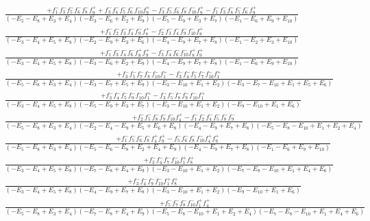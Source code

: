 \documentclass{article}
\begin{document}
\[\begin{array}{rcl}
\frac{+f_{1}^{-}f_{3}^{-}f_{5}^{-}f_{6}^{-}f_{8}^{-}f_{9}^{+}+f_{3}^{-}f_{4}^{-}f_{5}^{-}f_{6}^{-}f_{10}^{-}f_{9}^{+}-f_{3}^{-}f_{5}^{-}f_{6}^{-}f_{8}^{-}f_{10}^{-}f_{9}^{+}-f_{1}^{-}f_{3}^{-}f_{4}^{-}f_{5}^{-}f_{6}^{-}f_{9}^{+}}{(-E_{5}-E_{8}+E_{3}+E_{4})(-E_{3}-E_{6}+E_{2}+E_{9})(-E_{5}-E_{9}+E_{3}+E_{7})(-E_{1}-E_{6}+E_{9}+E_{10})}\\
\frac{+f_{1}^{-}f_{2}^{-}f_{3}^{-}f_{4}^{-}f_{9}^{-}f_{8}^{+}-f_{2}^{-}f_{3}^{-}f_{4}^{-}f_{9}^{-}f_{10}^{-}f_{8}^{+}}{(-E_{3}-E_{4}+E_{5}+E_{8})(-E_{2}-E_{9}+E_{3}+E_{6})(-E_{4}-E_{9}+E_{7}+E_{8})(-E_{1}-E_{2}+E_{3}+E_{10})}\\
\frac{+f_{1}^{-}f_{3}^{-}f_{4}^{-}f_{6}^{-}f_{8}^{+}f_{9}^{+}-f_{3}^{-}f_{4}^{-}f_{6}^{-}f_{10}^{-}f_{8}^{+}f_{9}^{+}}{(-E_{3}-E_{4}+E_{5}+E_{8})(-E_{3}-E_{6}+E_{2}+E_{9})(-E_{4}-E_{9}+E_{7}+E_{8})(-E_{1}-E_{6}+E_{9}+E_{10})}\\
\frac{+f_{3}^{-}f_{5}^{-}f_{7}^{-}f_{8}^{-}f_{10}^{-}f_{1}^{+}-f_{3}^{-}f_{4}^{-}f_{5}^{-}f_{7}^{-}f_{10}^{-}f_{1}^{+}}{(-E_{5}-E_{8}+E_{3}+E_{4})(-E_{3}-E_{7}+E_{5}+E_{9})(-E_{3}-E_{10}+E_{1}+E_{2})(-E_{3}-E_{7}-E_{10}+E_{1}+E_{5}+E_{6})}\\
\frac{+f_{3}^{-}f_{4}^{-}f_{5}^{-}f_{9}^{-}f_{10}^{-}f_{1}^{+}-f_{3}^{-}f_{5}^{-}f_{8}^{-}f_{9}^{-}f_{10}^{-}f_{1}^{+}}{(-E_{3}-E_{4}+E_{5}+E_{8})(-E_{5}-E_{9}+E_{3}+E_{7})(-E_{3}-E_{10}+E_{1}+E_{2})(-E_{9}-E_{10}+E_{1}+E_{6})}\\
\frac{+f_{2}^{-}f_{5}^{-}f_{8}^{-}f_{9}^{-}f_{10}^{-}f_{4}^{+}-f_{1}^{-}f_{2}^{-}f_{4}^{-}f_{5}^{-}f_{8}^{-}f_{9}^{-}}{(-E_{5}-E_{8}+E_{3}+E_{4})(-E_{2}-E_{4}-E_{9}+E_{5}+E_{6}+E_{8})(-E_{4}-E_{9}+E_{7}+E_{8})(-E_{5}-E_{8}-E_{10}+E_{1}+E_{2}+E_{4})}\\
\frac{+f_{1}^{-}f_{5}^{-}f_{6}^{-}f_{8}^{-}f_{4}^{+}f_{9}^{+}-f_{5}^{-}f_{6}^{-}f_{8}^{-}f_{10}^{-}f_{4}^{+}f_{9}^{+}}{(-E_{5}-E_{8}+E_{3}+E_{4})(-E_{5}-E_{6}-E_{8}+E_{2}+E_{4}+E_{9})(-E_{4}-E_{9}+E_{7}+E_{8})(-E_{1}-E_{6}+E_{9}+E_{10})}\\
\frac{+f_{3}^{-}f_{4}^{-}f_{7}^{-}f_{10}^{-}f_{1}^{+}f_{8}^{+}}{(-E_{3}-E_{4}+E_{5}+E_{8})(-E_{7}-E_{8}+E_{4}+E_{9})(-E_{3}-E_{10}+E_{1}+E_{2})(-E_{7}-E_{8}-E_{10}+E_{1}+E_{4}+E_{6})}\\
\frac{+f_{3}^{-}f_{4}^{-}f_{9}^{-}f_{10}^{-}f_{1}^{+}f_{8}^{+}}{(-E_{3}-E_{4}+E_{5}+E_{8})(-E_{4}-E_{9}+E_{7}+E_{8})(-E_{3}-E_{10}+E_{1}+E_{2})(-E_{9}-E_{10}+E_{1}+E_{6})}\\
\frac{+f_{5}^{-}f_{7}^{-}f_{8}^{-}f_{10}^{-}f_{1}^{+}f_{4}^{+}}{(-E_{5}-E_{8}+E_{3}+E_{4})(-E_{7}-E_{8}+E_{4}+E_{9})(-E_{5}-E_{8}-E_{10}+E_{1}+E_{2}+E_{4})(-E_{7}-E_{8}-E_{10}+E_{1}+E_{4}+E_{6})}\\

\end{array}\]
\end{document}
